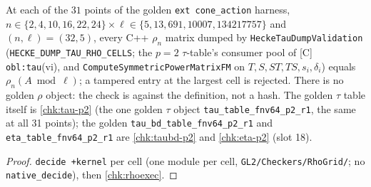 \begin{theorem}\label{orc:rhogrid}
  \leanok
  At each of the $31$ points of the golden \texttt{ext cone\_action} harness, $n\in\{2,4,10,16,22,24\}\times
  \ell\in\{5,13,691,10007,134217757\}$ and $(n,\ell)=(32,5)$, every C++ $\rho_n$ matrix dumped by \texttt{HeckeTauDumpValidation}
  (\texttt{HECKE\_DUMP\_TAU\_RHO\_CELLS}; the $p=2$ $\tau$-table's consumer pool of [C] \texttt{obl:tau}(vi), and
  \texttt{ComputeSymmetricPowerMatrixFM} on $T,S,ST,TS,s_i,\delta_i$) equals $\rho_n(A\bmod\ell)$; a tampered entry at the
  largest cell is rejected. There is no golden $\rho$ object: the check is against the definition, not a hash. The golden
  $\tau$ table itself is \ref{chk:tau-p2} (the one golden $\tau$ object \texttt{tau\_table\_fnv64\_p2\_r1}, the same at all
  31 points); the golden \texttt{tau\_bd\_table\_fnv64\_p2\_r1} and \texttt{eta\_table\_fnv64\_p2\_r1} are \ref{chk:taubd-p2}
  and \ref{chk:eta-p2} (slot 18).
\end{theorem}
\begin{proof}
  \leanok
  \texttt{decide +kernel} per cell (one module per cell, \texttt{GL2/Checkers/RhoGrid/}; no \texttt{native\_decide}), then
  \ref{chk:rhoexec}.
\end{proof}

